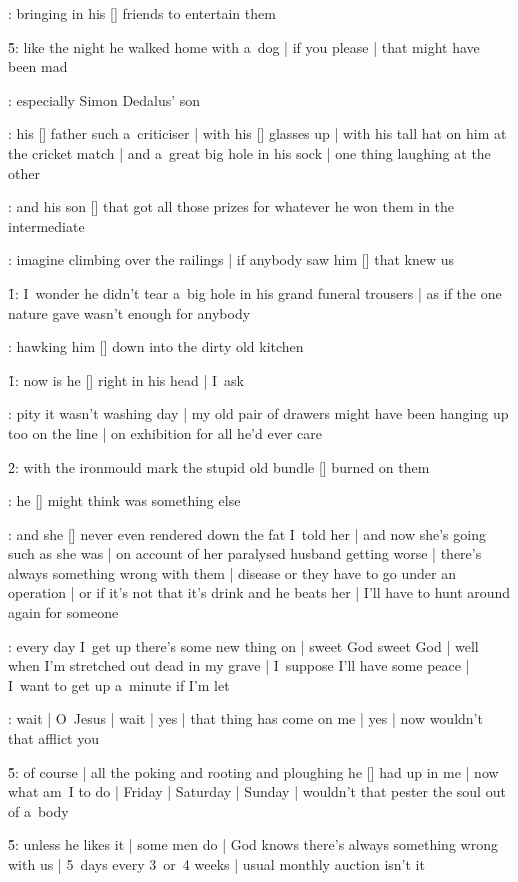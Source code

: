 :
bringing in his [\bloom] friends to entertain them

\f5:
like the night he walked home with a~dog |
if you please |
that might have been mad

:
especially Simon Dedalus' son

:
his [\stephen] father such a~criticiser |
with his [\simon] glasses up |
with his tall hat on him at the cricket match |
and a~great big hole in his sock |
one thing laughing at the other

:
and his son [\stephen] that got all those prizes
for whatever he won them in the intermediate

:
imagine climbing over the railings |
if anybody saw him [\bloom] that knew us

\f1:
I~wonder he didn't tear a~big hole in his grand funeral trousers |
as if the one nature gave wasn't enough for anybody

:
hawking him [\stephen] down into the dirty old kitchen

\f1:
now is he [\bloom] right in his head |
I~ask

:
pity it wasn't washing day |
my old pair of drawers might have been hanging up too on the line |
on exhibition for all he'd ever care

\f2:
with the ironmould mark the stupid old bundle [\mrsfleming] burned on them

:
he [\stephen] might think was something else

:
and she [\mrsfleming] never even rendered down the fat I~told her |
and now she's going such as she was |
on account of her paralysed husband getting worse |
there's always something wrong with them |
disease or they have to go under an operation |
or if it's not that it's drink and he beats her |
I'll have to hunt around again for someone

:
every day I~get up there's some new thing on |
sweet God sweet God |
well when I'm stretched out dead in my grave |
I~suppose I'll have some peace |
I~want to get up a~minute if I'm let

:
wait |
O~Jesus |
wait |
yes |
that thing has come on me |
yes |
now wouldn't that afflict you

\f5:
of course |
all the poking and rooting and ploughing
he [\boylan] had up in me |
now what am~I to do |
Friday |
Saturday |
Sunday |
wouldn't that pester the soul out of a~body

\f5:
unless he likes it |
some men do |
God knows there's always something wrong with us |
5~days every 3~or~4 weeks |
usual monthly auction isn't it

